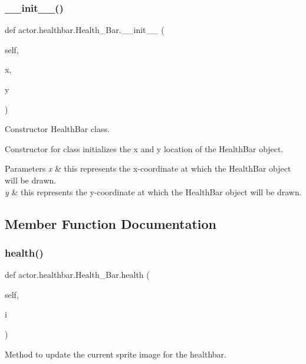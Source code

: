 \subsubsection{\texorpdfstring{\+\_\+\+\_\+init\+\_\+\+\_\+()}{\_\_init\_\_()}}
{\footnotesize\ttfamily def actor.\+healthbar.\+Health\+\_\+\+Bar.\+\_\+\+\_\+init\+\_\+\+\_\+ (\begin{DoxyParamCaption}\item[{}]{self,  }\item[{}]{x,  }\item[{}]{y }\end{DoxyParamCaption})}



Constructor Health\+Bar class. 

Constructor for class initializes the x and y location of the Health\+Bar object. 
\begin{DoxyParams}{Parameters}
{\em x} & this represents the x-\/coordinate at which the Health\+Bar object will be drawn. \\
\hline
{\em y} & this represents the y-\/coordinate at which the Health\+Bar object will be drawn. \\
\hline
\end{DoxyParams}


\subsection{Member Function Documentation}
\mbox{\label{classactor_1_1healthbar_1_1_health___bar_a13d9c179f223a080426841ed336407b5}} 
\subsubsection{\texorpdfstring{health()}{health()}}
{\footnotesize\ttfamily def actor.\+healthbar.\+Health\+\_\+\+Bar.\+health (\begin{DoxyParamCaption}\item[{}]{self,  }\item[{}]{i }\end{DoxyParamCaption})}



Method to update the current sprite image for the healthbar. 

